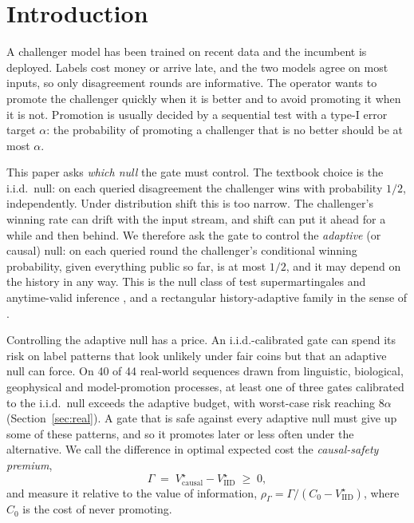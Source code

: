 \documentclass{article}
\theoremstyle{plain}
\theoremstyle{definition}
\theoremstyle{remark}
\newcommand{\Vc}{V^\star_{\mathrm{causal}}}
\newcommand{\Vi}{V^\star_{\mathrm{IID}}}
\newcommand{\rhoG}{\rho_\Gamma}
\begin{document}
\section{Introduction}
\label{sec:intro}

A challenger model has been trained on recent data and the incumbent is deployed. Labels cost money or arrive late, and the two models agree on most inputs, so only disagreement rounds are informative. The operator wants to promote the challenger quickly when it is better and to avoid promoting it when it is not. Promotion is usually decided by a sequential test with a type-I error target $\alpha$: the probability of promoting a challenger that is no better should be at most $\alpha$.

This paper asks \emph{which null} the gate must control. The textbook choice is the i.i.d.\ null: on each queried disagreement the challenger wins with probability $1/2$, independently. Under distribution shift this is too narrow. The challenger's winning rate can drift with the input stream, and shift can put it ahead for a while and then behind. We therefore ask the gate to control the \emph{adaptive} (or causal) null: on each queried round the challenger's conditional winning probability, given everything public so far, is at most $1/2$, and it may depend on the history in any way. This is the null class of test supermartingales and anytime-valid inference \citep{ramdas2023gametheoretic,waudbysmith2024betting}, and a rectangular history-adaptive family in the sense of \citet{fauss2020minimax}.

Controlling the adaptive null has a price. An i.i.d.-calibrated gate can spend its risk on label patterns that look unlikely under fair coins but that an adaptive null can force. On 40 of 44 real-world sequences drawn from linguistic, biological, geophysical and model-promotion processes, at least one of three gates calibrated to the i.i.d.\ null exceeds the adaptive budget, with worst-case risk reaching $8\alpha$ (Section~\ref{sec:real}). A gate that is safe against every adaptive null must give up some of these patterns, and so it promotes later or less often under the alternative. We call the difference in optimal expected cost the \emph{causal-safety premium},
\[
\Gamma \;=\; \Vc - \Vi \;\ge\; 0,
\]
and measure it relative to the value of information, $\rhoG = \Gamma/(C_0 - \Vi)$, where $C_0$ is the cost of never promoting.
\end{document}
